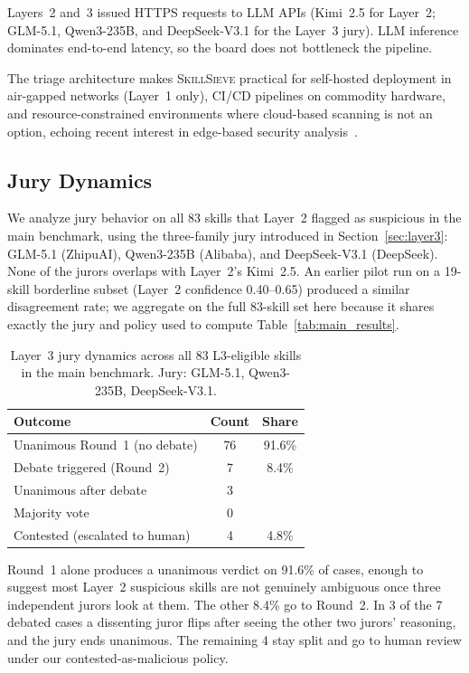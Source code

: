 \documentclass[sigconf,nonacm]{acmart}
\begin{document}
Layers~2 and~3 issued HTTPS requests to LLM APIs (Kimi~2.5 for Layer~2; GLM-5.1, Qwen3-235B, and DeepSeek-V3.1 for the Layer~3 jury). LLM inference dominates end-to-end latency, so the board does not bottleneck the pipeline.

The triage architecture makes \textsc{SkillSieve} practical for self-hosted deployment in air-gapped networks (Layer~1 only), CI/CD pipelines on commodity hardware, and resource-constrained environments where cloud-based scanning is not an option, echoing recent interest in edge-based security analysis~\cite{edgellm2025,loraedge2026}.

\subsection{Jury Dynamics}

We analyze jury behavior on all 83 skills that Layer~2 flagged as suspicious in the main benchmark, using the three-family jury introduced in Section~\ref{sec:layer3}: GLM-5.1 (ZhipuAI), Qwen3-235B (Alibaba), and DeepSeek-V3.1 (DeepSeek). None of the jurors overlaps with Layer~2's Kimi~2.5. An earlier pilot run on a 19-skill borderline subset (Layer~2 confidence 0.40--0.65) produced a similar disagreement rate; we aggregate on the full 83-skill set here because it shares exactly the jury and policy used to compute Table~\ref{tab:main_results}.

\begin{table}[!htbp]
\centering
\caption{Layer~3 jury dynamics across all 83 L3-eligible skills in the main benchmark. Jury: GLM-5.1, Qwen3-235B, DeepSeek-V3.1.}
\label{tab:jury}
\begin{tabular}{lcc}
\toprule
\textbf{Outcome} & \textbf{Count} & \textbf{Share} \\
\midrule
Unanimous Round~1 (no debate) & 76 & 91.6\% \\
Debate triggered (Round~2) & 7 & 8.4\% \\
\quad Unanimous after debate & 3 & \\
\quad Majority vote & 0 & \\
\quad Contested (escalated to human) & 4 & 4.8\% \\
\bottomrule
\end{tabular}
\end{table}

Round~1 alone produces a unanimous verdict on 91.6\% of cases, enough to suggest most Layer~2 suspicious skills are not genuinely ambiguous once three independent jurors look at them. The other 8.4\% go to Round~2. In 3 of the 7 debated cases a dissenting juror flips after seeing the other two jurors' reasoning, and the jury ends unanimous. The remaining 4 stay split and go to human review under our contested-as-malicious policy.
\end{document}
